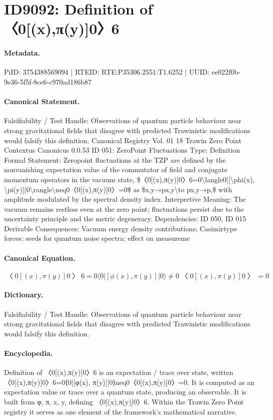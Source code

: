 \section*{ID9092: Definition of 〈0[(x),π(y)]0〉6}
\paragraph{Metadata.}
PiID: 3754388569094 | RTEID: RTE:P35306.2551:T1.6252 | UUID: ee022f0b-9e36-5f5f-8ce6-c970ad186b87

\paragraph{Canonical Statement.}
Falsifiability / Test Handle: Observations of quantum particle behaviour near strong gravitational fields that disagree with predicted Trawinistic modifications would falsify this definition. Canonical Registry Vol. 01 18 Trawin Zero Point Contextus Canonicus 0.0.53 ID 051: ZeroPoint Fluctuations Type: Definition Formal Statement: Zeropoint fluctuations at the TZP are defined by the nonvanishing expectation value of the commutator of field and conjugate momentum operators in the vacuum state, \$〈0[(x),π(y)]0〉6=0\textbackslash{}langle0|[\textbackslash{}phi(x), \textbackslash{}pi(y)]|0\textbackslash{}rangle\textbackslash{}neq0〈0[(x),π(y)]0〉=0\$ as \$x,y→px,y\textbackslash{}to px,y→p,\$ with amplitude modulated by the spectral density index. Interpretive Meaning: The vacuum remains restless even at the zero point; fluctuations persist due to the uncertainty principle and the metric degeneracy. Dependencies: ID 050, ID 015 Derivable Consequences: Vacuum energy density contributions; Casimirtype forces; seeds for quantum noise spectra; effect on measureme

\paragraph{Canonical Equation.}
\[
〈0[(x),π(y)]0〉6=0\langle0|[\phi(x), \pi(y)]|0\rangle\neq0〈0[(x),π(y)]0〉=0
\]

\paragraph{Dictionary.}
Falsifiability / Test Handle: Observations of quantum particle behaviour near strong gravitational fields that disagree with predicted Trawinistic modifications would falsify this definition.

\paragraph{Encyclopedia.}
Definition of 〈0[(x),π(y)]0〉6 is an expectation / trace over state, written 〈0[(x),π(y)]0〉6=0⟨0|[φ(x), π(y)]|0⟩neq0〈0[(x),π(y)]0〉=0. It is computed as an expectation value or trace over a quantum state, producing an observable. It is built from φ, π, x, y, defining 〈0[(x),π(y)]0〉6. Within the Trawin Zero Point registry it serves as one element of the framework's mathematical narrative.
